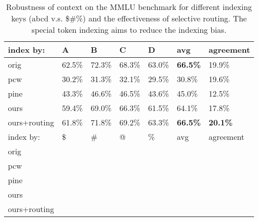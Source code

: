 \begin{table}[t]

\resizebox{\linewidth}{!}
{

\begin{tabular}{@{}l|llll|l|l@{}}
\toprule
index by:    & A      & B      & C      & D      & avg             & agreement       \\ \midrule
orig         & 62.5\% & 72.3\% & 68.3\% & 63.0\% & \textbf{66.5\%} & 19.9\%          \\
pcw          & 30.2\% & 31.3\% & 32.1\% & 29.5\% & 30.8\%          & 19.6\%          \\
pine         & 43.3\% & 46.6\% & 46.5\% & 43.6\% & 45.0\%          & 12.5\%          \\
ours         & 59.4\% & 69.0\% & 66.3\% & 61.5\% & 64.1\%          & 17.8\%          \\
ours+routing & 61.8\% & 71.8\% & 69.2\% & 63.3\% & \textbf{66.5\%} & \textbf{20.1\%} \\ \midrule
index by:    & \$     & \#     & @      & \%     & avg             & agreement       \\ \midrule
orig         &        &        &        &        &                 &                 \\
pcw          &        &        &        &        &                 &                 \\
pine         &        &        &        &        &                 &                 \\
ours         &        &        &        &        &                 &                 \\
ours+routing &        &        &        &        &                 &                 \\ \bottomrule
\end{tabular}

}
\caption{Robustness of context on the MMLU benchmark for different indexing keys (abcd v.s. \$\#\@\%) and the effectiveness of selective routing. The special token indexing aims to reduce the indexing bias.}
\label{table/mmlu_main}

\end{table}
